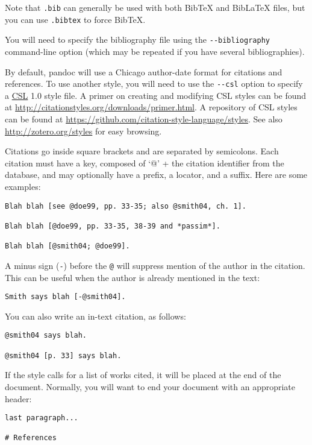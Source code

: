 \documentclass[]{article}
\begin{document}
Note that \texttt{.bib} can generally be used with both BibTeX and
BibLaTeX files, but you can use \texttt{.bibtex} to force BibTeX.

You will need to specify the bibliography file using the
\texttt{-{}-bibliography} command-line option (which may be repeated if
you have several bibliographies).

By default, pandoc will use a Chicago author-date format for citations
and references. To use another style, you will need to use the
\texttt{-{}-csl} option to specify a
\href{http://CitationStyles.org}{CSL} 1.0 style file. A primer on
creating and modifying CSL styles can be found at
\url{http://citationstyles.org/downloads/primer.html}. A repository of
CSL styles can be found at
\url{https://github.com/citation-style-language/styles}. See also
\url{http://zotero.org/styles} for easy browsing.

Citations go inside square brackets and are separated by semicolons.
Each citation must have a key, composed of `@' + the citation identifier
from the database, and may optionally have a prefix, a locator, and a
suffix. Here are some examples:

\begin{verbatim}
Blah blah [see @doe99, pp. 33-35; also @smith04, ch. 1].

Blah blah [@doe99, pp. 33-35, 38-39 and *passim*].

Blah blah [@smith04; @doe99].
\end{verbatim}

A minus sign (\texttt{-}) before the \texttt{@} will suppress mention of
the author in the citation. This can be useful when the author is
already mentioned in the text:

\begin{verbatim}
Smith says blah [-@smith04].
\end{verbatim}

You can also write an in-text citation, as follows:

\begin{verbatim}
@smith04 says blah.

@smith04 [p. 33] says blah.
\end{verbatim}

If the style calls for a list of works cited, it will be placed at the
end of the document. Normally, you will want to end your document with
an appropriate header:

\begin{verbatim}
last paragraph...

# References
\end{verbatim}
\end{document}
